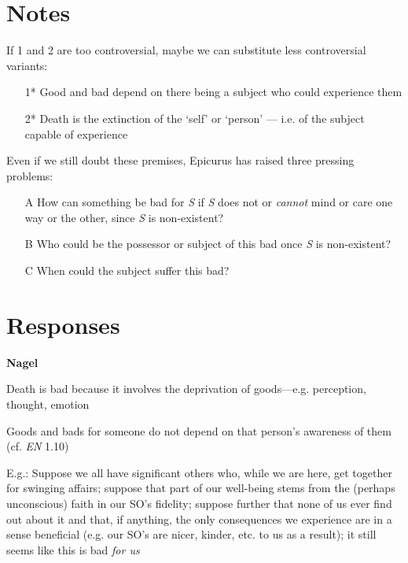 \documentclass[11pt]{article}
\begin{document}
\section*{Notes}
If 1 and 2 are too controversial, maybe we can substitute less controversial variants:

\begin{enumerate}
\item[1*] Good and bad depend on there being a subject who could experience them
\item[2*] Death is the extinction of the `self' or `person' --- i.e. of the subject capable of experience
\end{enumerate}
Even if we still doubt these premises, Epicurus has raised three pressing problems: 
\begin{enumerate}
\item[A] How can something be bad for \emph{S} if \emph{S} does not or \emph{cannot} mind or care one way or the other, since \emph{S} is non-existent?
\item[B] Who could be the possessor or subject of this bad once \emph{S} is non-existent?
\item[C] When could the subject suffer this bad?
\end{enumerate}

\section*{Responses}

\noindent \textbf{Nagel}
\vspace*{2mm}

\noindent [1] Death is bad because it involves the deprivation of goods---e.g. perception, thought, emotion
\vspace*{1mm}

\noindent [2] Goods and bads for someone do not depend on that person's awareness of them (cf. \emph{EN} 1.10)
\vspace*{1mm}

\noindent E.g.: Suppose we all have significant others who, while we are here, get together for swinging affairs; suppose that part of our well-being stems from the (perhaps unconscious) faith in our SO's fidelity; suppose further that none of us ever find out about it and that, if anything, the only consequences we experience are in a sense beneficial (e.g. our SO's are nicer, kinder, etc. to us as a result); it still seems like this is bad \emph{for us}
\vspace*{2mm}
\end{document}
